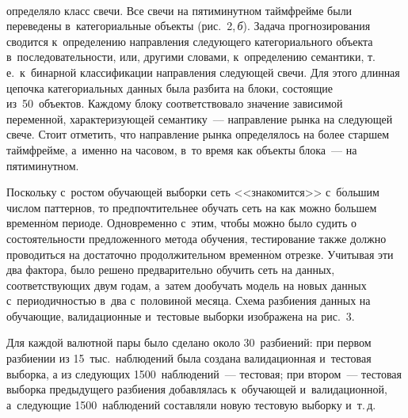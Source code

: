 {\begin{multicols}{2}
  
   
 
\begin{figure*} %
  \vspace*{1pt}
  \begin{center}  
    \mbox{%
\epsfxsize=163mm
}

\end{center}
\vspace*{-12pt}
   \end{figure*}
%
  
  \noindent
   определяло класс 
свечи. Все свечи на пятиминутном таймфрейме были переведены в~категориальные объекты 
  (рис.~2,\,\textit{б}). Задача прогнозирования
   сводится к~определению направления следующего 
категориального объекта в~последовательности, или, другими словами, к~определению 
семантики, т.\,е.\ к~бинарной классификации направления следующей свечи. Для этого 
длинная цепочка категориальных данных была разбита на блоки, состоящие из~50~объектов. 
Каждому блоку соответствовало значение зависимой переменной, характеризующей 
семантику~--- направление рынка на следующей свече. Стоит отметить, что направление 
рынка определялось на более старшем таймфрейме, а~именно на часовом, в~то время как 
объекты блока~--- на пятиминутном. 
  
  Поскольку с~ростом обучающей выборки сеть <<знакомится>> 
  с~б$\acute{\mbox{о}}$льшим числом паттернов, то предпочтительнее обучать сеть на как 
можно большем временн$\acute{\mbox{о}}$м периоде. Одновременно с~этим, чтобы можно 
было судить о состоятельности предложенного метода обучения, тестирование также 
должно проводиться на достаточно продолжительном временн$\acute{\mbox{о}}$м отрезке. 
Учитывая эти два фактора, было решено предварительно обучить сеть на данных, 
соответствующих двум годам, а~затем до\-обучать модель на новых данных с~периодичностью 
в~два с~половиной месяца. Схема разбиения данных на обучающие, валидационные 
и~тестовые выборки изображена на рис.~3. 
  
 
   
  Для каждой валютной пары было сделано около 30~разбиений: при первом 
разбиении из 15~тыс.\  наблюдений была создана валидационная и~тестовая 
выборка, а из следующих 1500~наблюдений~--- тестовая; при втором~--- тестовая 
выборка предыдущего разбиения добавлялась к~обучающей и~валидационной, а~следующие 
1500~наблюдений составляли новую тестовую выборку и~т.\,д.


\end{multicols}}
